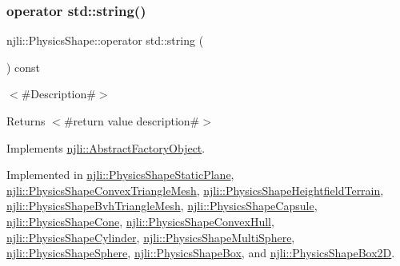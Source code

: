 \subsubsection{\texorpdfstring{operator std\+::string()}{operator std::string()}}
{\footnotesize\ttfamily njli\+::\+Physics\+Shape\+::operator std\+::string (\begin{DoxyParamCaption}{ }\end{DoxyParamCaption}) const\hspace{0.3cm}{\ttfamily [pure virtual]}}

$<$\#\+Description\#$>$

\begin{DoxyReturn}{Returns}
$<$\#return value description\#$>$ 
\end{DoxyReturn}


Implements \mbox{\hyperlink{classnjli_1_1_abstract_factory_object_a838f4fa7e65cace6098aab5222892942}{njli\+::\+Abstract\+Factory\+Object}}.



Implemented in \mbox{\hyperlink{classnjli_1_1_physics_shape_static_plane_ad47cccb4bc99838d9f8f3820930ba028}{njli\+::\+Physics\+Shape\+Static\+Plane}}, \mbox{\hyperlink{classnjli_1_1_physics_shape_convex_triangle_mesh_a511b9645026962471fdb4a12cef49a37}{njli\+::\+Physics\+Shape\+Convex\+Triangle\+Mesh}}, \mbox{\hyperlink{classnjli_1_1_physics_shape_heightfield_terrain_ae7f37e3f8c8cf55663727e025ee618f5}{njli\+::\+Physics\+Shape\+Heightfield\+Terrain}}, \mbox{\hyperlink{classnjli_1_1_physics_shape_bvh_triangle_mesh_af6efd230aa3b4d6dce9717586ac0630a}{njli\+::\+Physics\+Shape\+Bvh\+Triangle\+Mesh}}, \mbox{\hyperlink{classnjli_1_1_physics_shape_capsule_a3ca9563249b80caa6c7e745d49340130}{njli\+::\+Physics\+Shape\+Capsule}}, \mbox{\hyperlink{classnjli_1_1_physics_shape_cone_aa424b40c2427b3fc907e359e2c1d026d}{njli\+::\+Physics\+Shape\+Cone}}, \mbox{\hyperlink{classnjli_1_1_physics_shape_convex_hull_ad1f7999f76923d03c3324371595f8bec}{njli\+::\+Physics\+Shape\+Convex\+Hull}}, \mbox{\hyperlink{classnjli_1_1_physics_shape_cylinder_afdffa5511a58e1bd0898716ecfb111cd}{njli\+::\+Physics\+Shape\+Cylinder}}, \mbox{\hyperlink{classnjli_1_1_physics_shape_multi_sphere_a34d365099e710fa7dfb1bf010674eb2c}{njli\+::\+Physics\+Shape\+Multi\+Sphere}}, \mbox{\hyperlink{classnjli_1_1_physics_shape_sphere_a2aac2eef57be19f2882c647087c71343}{njli\+::\+Physics\+Shape\+Sphere}}, \mbox{\hyperlink{classnjli_1_1_physics_shape_box_aeeaae082ee5e0fcc1fe07cff9af3d940}{njli\+::\+Physics\+Shape\+Box}}, and \mbox{\hyperlink{classnjli_1_1_physics_shape_box2_d_a66e77cf7de8db55806fd760ff66591b0}{njli\+::\+Physics\+Shape\+Box2D}}.

